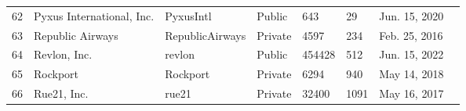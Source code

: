 \documentclass[9pt,twoside,lineno]{pnas-new}
\begin{document}
\begin{longtable}{llllllll}
62          & Pyxus International, Inc.                                                       & PyxusIntl                                                           & Public           & 643                & 29                 & Jun. 15, 2020                                                                                                                         \\
63          & Republic Airways                                                                & RepublicAirways                                                     & Private          & 4597               & 234            & Feb. 25, 2016                                                                                                                     \\
64          & Revlon, Inc.                                                                    & revlon                                                              & Public           & 454428             & 512                & Jun. 15, 2022                                                                                                                         \\
65          & Rockport                                                                        & Rockport                                                            & Private          & 6294               & 940                & May 14, 2018                                                                                                                          \\
66          & Rue21, Inc.                                                                     & rue21                                                               & Private          & 32400              & 1091               & May 16, 2017                                                                                                                          \\

\end{longtable}
\end{document}
